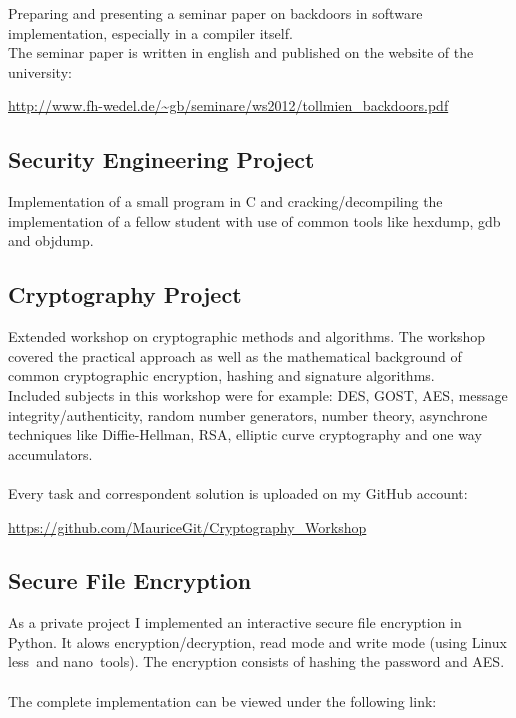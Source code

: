 \documentclass[a4paper, 12pt]{article}
\begin{document}
Preparing and presenting a seminar paper on backdoors in software implementation, especially in 
a compiler itself.
\\
The seminar paper is written in english and published on the website of the university:

\begin{center}
	\url{http://www.fh-wedel.de/~gb/seminare/ws2012/tollmien_backdoors.pdf}
\end{center}

\subsection{Security Engineering Project}

Implementation of a small program in C and cracking/decompiling the implementation of a fellow student with use
of common tools like hexdump, gdb and objdump.

\subsection{Cryptography Project}

Extended workshop on cryptographic methods and algorithms. The workshop covered the practical approach as well as
the mathematical background of common cryptographic encryption, hashing and signature algorithms.
\\
Included subjects in this workshop were for example: DES, GOST, AES, message integrity/authenticity, random number
generators, number theory, asynchrone techniques like Diffie-Hellman, RSA, elliptic curve cryptography and one way
accumulators.
\\
\\
Every task and correspondent solution is uploaded on my GitHub account:

\begin{center}
	\url{https://github.com/MauriceGit/Cryptography_Workshop}
\end{center}

\subsection{Secure File Encryption}

As a private project I implemented an interactive secure file encryption in Python. It alows encryption/decryption, read mode and write mode (using Linux \glq less\grq\  and \glq nano\grq\ tools). The encryption consists of hashing the password and AES.
\\
\\
The complete implementation can be viewed under the following link:
\end{document}

